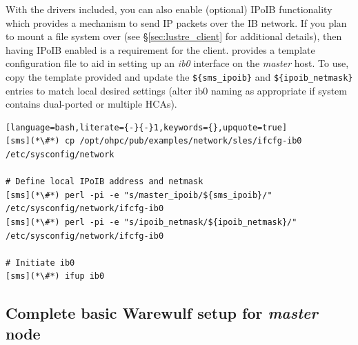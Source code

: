 \documentclass[letterpaper]{article}
\begin{document}
With the \InfiniBand{} drivers included, you can also enable (optional) IPoIB functionality
which provides a mechanism to send IP packets over the IB network. If you plan
to mount a \Lustre{} file system over \InfiniBand{} (see \S\ref{sec:lustre_client}
for additional details), then having IPoIB enabled is a requirement for the
\Lustre{} client. \OHPC{} provides a template configuration file to aid in setting up
an {\em ib0} interface on the {\em master} host. To use, copy the template
provided and update the \texttt{\$\{sms\_ipoib\}} and
\texttt{\$\{ipoib\_netmask\}} entries to match local desired settings (alter ib0
naming as appropriate if system contains dual-ported or multiple HCAs). 

\begin{lstlisting}[language=bash,literate={-}{-}1,keywords={},upquote=true]
[sms](*\#*) cp /opt/ohpc/pub/examples/network/sles/ifcfg-ib0 /etc/sysconfig/network

# Define local IPoIB address and netmask
[sms](*\#*) perl -pi -e "s/master_ipoib/${sms_ipoib}/" /etc/sysconfig/network/ifcfg-ib0
[sms](*\#*) perl -pi -e "s/ipoib_netmask/${ipoib_netmask}/" /etc/sysconfig/network/ifcfg-ib0

# Initiate ib0
[sms](*\#*) ifup ib0
\end{lstlisting}

\subsection{Complete basic Warewulf setup for {\em master} node} \label{sec:setup_ww}


\end{document}
